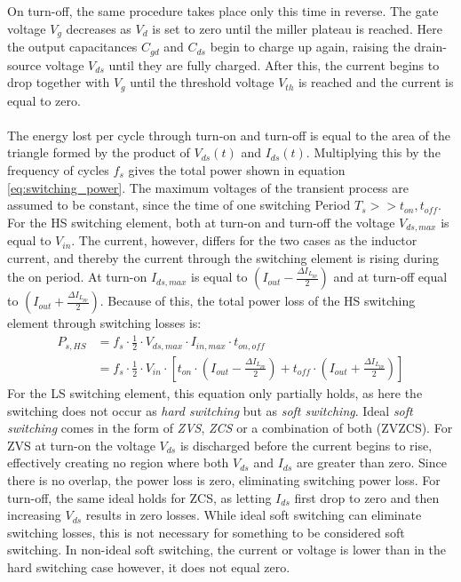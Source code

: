 On turn-off, the same procedure takes place only this time in reverse. The gate voltage $V_g$ decreases as $V_d$ is set to zero until the miller plateau is reached. Here the output capacitances $C_{gd}$ and $C_{ds}$ begin to charge up again, raising the drain-source voltage $V_{ds}$ until they are fully charged. After this, the current begins to drop together with $V_g$ until the threshold voltage $V_{th}$ is reached and the current is equal to zero.\\\\
The energy lost per cycle through turn-on and turn-off is equal to the area of the triangle formed by the product of $V_{ds}(t)$ and $I_{ds}(t)$. Multiplying this by the frequency of cycles $f_s$ gives the total power shown in equation \ref{eq:switching_power}.
The maximum voltages of the transient process are assumed to be constant, since the time of one switching Period $T_s >> t_{on},t_{off}$. For the HS switching element, both at turn-on and turn-off the voltage $V_{ds,max}$ is equal to $V_{in}$. The current, however, differs for the two cases as the inductor current, and thereby the current through the switching element is rising during the on period. At turn-on $I_{ds,max}$ is equal to $(I_{out} - \frac{\Delta I_{L_{pp}}}{2})$ and at turn-off equal to $(I_{out} + \frac{\Delta I_{L_{pp}}}{2})$. Because of this, the total power loss of the HS switching element through switching losses is:
\begin{align}
    P_{s,HS} &= f_s \cdot \frac{1}{2} \cdot V_{ds,max} \cdot I_{in,max} \cdot t_{on,off}\label{eq:switching_power} \\
    &= f_s \cdot \frac{1}{2} \cdot V_{in} \cdot \left[t_{on} \cdot \left(I_{out} - \frac{\Delta I_{L_{pp}}}{2}\right) + t_{off} \cdot \left(I_{out} + \frac{\Delta I_{L_{pp}}}{2}\right)\right]
\end{align}
For the LS switching element, this equation only partially holds, as here the switching does not occur as \textit{hard switching} but as \textit{soft switching}. Ideal \textit{soft switching} comes in the form of \textit{\ac{ZVS}}, \textit{\ac{ZCS}} or a combination of both (ZVZCS). For \ac{ZVS} at turn-on the voltage $V_{ds}$ is discharged before the current begins to rise, effectively creating no region where both $V_{ds}$ and $I_{ds}$ are greater than zero. Since there is no overlap, the power loss is zero, eliminating switching power loss. For turn-off, the same ideal holds for \ac{ZCS}, as letting $I_{ds}$ first drop to zero and then increasing $V_{ds}$ results in zero losses. While ideal soft switching can eliminate switching losses, this is not necessary for something to be considered soft switching. In non-ideal soft switching, the current or voltage is lower than in the hard switching case however, it does not equal zero.\\
